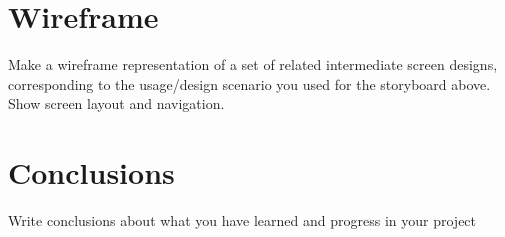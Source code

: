 \documentclass[12pt]{scrartcl}
\begin{document}
\section{Wireframe}

	Make a wireframe representation of a set of related intermediate screen designs, corresponding to the usage/design scenario you used for the storyboard above.  Show screen layout and navigation.
	
\section{Conclusions}

	Write conclusions about what you have learned and progress in your project
\end{document}
